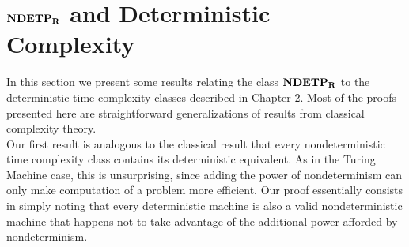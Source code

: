 

  

  
  

\section{$\mathbf{NDETP_R}$ and Deterministic Complexity}

In this section we present some results relating the class $\mathbf{NDETP_R}$ to
the deterministic time complexity classes described in Chapter 2.
Most of the proofs presented here are straightforward generalizations
of results from classical complexity theory.\\

Our first result is analogous to the classical result that every
nondeterministic time complexity class contains its deterministic
equivalent.  As in the Turing Machine case, this is unsurprising,
since adding the power of nondeterminism can only make computation of
a problem more efficient.  Our proof essentially consists in simply
noting that every deterministic machine is also a valid
nondeterministic machine that happens not to take advantage of the
additional power afforded by nondeterminism.


